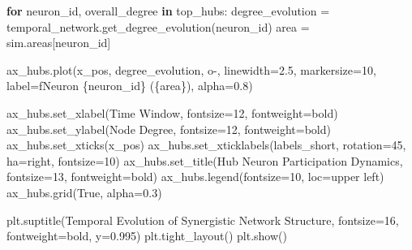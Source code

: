\documentclass[
  11pt,
  letterpaper,
  oneside,
  openany]{book}
\newenvironment{Shaded}{\begin{snugshade}}{\end{snugshade}}
\newcommand{\ControlFlowTok}[1]{\textcolor[rgb]{0.00,0.23,0.31}{\textbf{#1}}}
\newcommand{\DecValTok}[1]{\textcolor[rgb]{0.68,0.00,0.00}{#1}}
\newcommand{\FloatTok}[1]{\textcolor[rgb]{0.68,0.00,0.00}{#1}}
\newcommand{\KeywordTok}[1]{\textcolor[rgb]{0.00,0.23,0.31}{\textbf{#1}}}
\newcommand{\NormalTok}[1]{\textcolor[rgb]{0.00,0.23,0.31}{#1}}
\newcommand{\OperatorTok}[1]{\textcolor[rgb]{0.37,0.37,0.37}{#1}}
\newcommand{\SpecialCharTok}[1]{\textcolor[rgb]{0.37,0.37,0.37}{#1}}
\newcommand{\SpecialStringTok}[1]{\textcolor[rgb]{0.13,0.47,0.30}{#1}}
\newcommand{\StringTok}[1]{\textcolor[rgb]{0.13,0.47,0.30}{#1}}
\newcommand{\VariableTok}[1]{\textcolor[rgb]{0.07,0.07,0.07}{#1}}
\begin{document}
\begin{Shaded}
\begin{Highlighting}[]
\ControlFlowTok{for}\NormalTok{ neuron\_id, overall\_degree }\KeywordTok{in}\NormalTok{ top\_hubs:}
\NormalTok{    degree\_evolution }\OperatorTok{=}\NormalTok{ temporal\_network.get\_degree\_evolution(neuron\_id)}
\NormalTok{    area }\OperatorTok{=}\NormalTok{ sim.areas[neuron\_id]}
    
\NormalTok{    ax\_hubs.plot(x\_pos, degree\_evolution, }\StringTok{\textquotesingle{}o{-}\textquotesingle{}}\NormalTok{, linewidth}\OperatorTok{=}\FloatTok{2.5}\NormalTok{, markersize}\OperatorTok{=}\DecValTok{10}\NormalTok{,}
\NormalTok{                label}\OperatorTok{=}\SpecialStringTok{f\textquotesingle{}Neuron }\SpecialCharTok{\{}\NormalTok{neuron\_id}\SpecialCharTok{\}}\SpecialStringTok{ (}\SpecialCharTok{\{}\NormalTok{area}\SpecialCharTok{\}}\SpecialStringTok{)\textquotesingle{}}\NormalTok{, alpha}\OperatorTok{=}\FloatTok{0.8}\NormalTok{)}

\NormalTok{ax\_hubs.set\_xlabel(}\StringTok{\textquotesingle{}Time Window\textquotesingle{}}\NormalTok{, fontsize}\OperatorTok{=}\DecValTok{12}\NormalTok{, fontweight}\OperatorTok{=}\StringTok{\textquotesingle{}bold\textquotesingle{}}\NormalTok{)}
\NormalTok{ax\_hubs.set\_ylabel(}\StringTok{\textquotesingle{}Node Degree\textquotesingle{}}\NormalTok{, fontsize}\OperatorTok{=}\DecValTok{12}\NormalTok{, fontweight}\OperatorTok{=}\StringTok{\textquotesingle{}bold\textquotesingle{}}\NormalTok{)}
\NormalTok{ax\_hubs.set\_xticks(x\_pos)}
\NormalTok{ax\_hubs.set\_xticklabels(labels\_short, rotation}\OperatorTok{=}\DecValTok{45}\NormalTok{, ha}\OperatorTok{=}\StringTok{\textquotesingle{}right\textquotesingle{}}\NormalTok{, fontsize}\OperatorTok{=}\DecValTok{10}\NormalTok{)}
\NormalTok{ax\_hubs.set\_title(}\StringTok{\textquotesingle{}Hub Neuron Participation Dynamics\textquotesingle{}}\NormalTok{, fontsize}\OperatorTok{=}\DecValTok{13}\NormalTok{, fontweight}\OperatorTok{=}\StringTok{\textquotesingle{}bold\textquotesingle{}}\NormalTok{)}
\NormalTok{ax\_hubs.legend(fontsize}\OperatorTok{=}\DecValTok{10}\NormalTok{, loc}\OperatorTok{=}\StringTok{\textquotesingle{}upper left\textquotesingle{}}\NormalTok{)}
\NormalTok{ax\_hubs.grid(}\VariableTok{True}\NormalTok{, alpha}\OperatorTok{=}\FloatTok{0.3}\NormalTok{)}

\NormalTok{plt.suptitle(}\StringTok{\textquotesingle{}Temporal Evolution of Synergistic Network Structure\textquotesingle{}}\NormalTok{, }
\NormalTok{             fontsize}\OperatorTok{=}\DecValTok{16}\NormalTok{, fontweight}\OperatorTok{=}\StringTok{\textquotesingle{}bold\textquotesingle{}}\NormalTok{, y}\OperatorTok{=}\FloatTok{0.995}\NormalTok{)}
\NormalTok{plt.tight\_layout()}
\NormalTok{plt.show()}


\end{Highlighting}
\end{Shaded}
\end{document}
